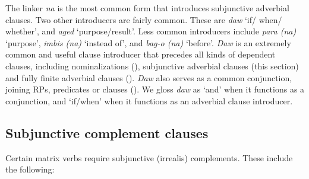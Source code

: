 The linker \textit{na} is the most common form that introduces subjunctive adverbial clauses. Two other introducers are fairly common. These are \textit{daw} ‘if/ when/ whether’, and \textit{aged} ‘purpose/result’. Less common introducers include \textit{para (na)} ‘purpose’, \textit{imbis (na)} ‘instead of’, and \textit{bag-o (na)} ‘before’. \textit{Daw} is an extremely common and useful clause introducer that precedes all kinds of dependent clauses, including nominalizations (), subjunctive adverbial clauses (this section) and fully finite adverbial clauses (). \textit{Daw} also serves as a common conjunction, joining RPs, predicates or clauses (). We gloss \textit{daw} as ‘and’ when it functions as a conjunction, and ‘if/when’ when it functions as an adverbial clause introducer.
\subsection{Subjunctive complement clauses}
\label{sec:subjunctivecomplementclauses}
Certain matrix verbs require subjunctive (irrealis) complements. These include the following:

